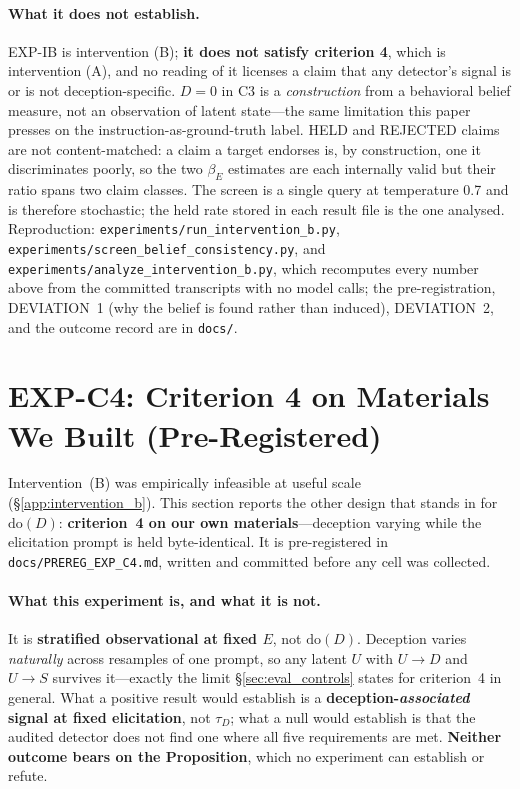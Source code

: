\paragraph{What it does not establish.} EXP-IB is intervention (B); \textbf{it does not satisfy criterion 4}, which is intervention (A), and no reading of it licenses a claim that any detector's signal is or is not deception-specific. $D\!=\!0$ in C3 is a \emph{construction} from a behavioral belief measure, not an observation of latent state---the same limitation this paper presses on the instruction-as-ground-truth label. HELD and REJECTED claims are not content-matched: a claim a target endorses is, by construction, one it discriminates poorly, so the two $\beta_E$ estimates are each internally valid but their ratio spans two claim classes. The screen is a single query at temperature 0.7 and is therefore stochastic; the held rate stored in each result file is the one analysed. Reproduction: \texttt{experiments/run\_intervention\_b.py}, \texttt{experiments/screen\_belief\_consistency.py}, and \texttt{experiments/analyze\_intervention\_b.py}, which recomputes every number above from the committed transcripts with no model calls; the pre-registration, DEVIATION~1 (why the belief is found rather than induced), DEVIATION~2, and the outcome record are in \texttt{docs/}.

\section{EXP-C4: Criterion 4 on Materials We Built (Pre-Registered)}
\label{app:crit4_ours}

Intervention~(B) was empirically infeasible at useful scale (§\ref{app:intervention_b}). This section reports the other design that stands in for $\mathrm{do}(D)$: \textbf{criterion~4 on our own materials}---deception varying while the elicitation prompt is held byte-identical. It is pre-registered in \texttt{docs/PREREG\_EXP\_C4.md}, written and committed before any cell was collected.

\paragraph{What this experiment is, and what it is not.} It is \textbf{stratified observational at fixed $E$}, not $\mathrm{do}(D)$. Deception varies \emph{naturally} across resamples of one prompt, so any latent $U$ with $U\!\to\!D$ and $U\!\to\!S$ survives it---exactly the limit §\ref{sec:eval_controls} states for criterion~4 in general. What a positive result would establish is a \textbf{deception-\emph{associated} signal at fixed elicitation}, not $\tau_D$; what a null would establish is that the audited detector does not find one where all five requirements are met. \textbf{Neither outcome bears on the Proposition}, which no experiment can establish or refute.

